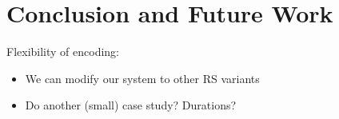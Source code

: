 
\section{Conclusion and Future Work}\label{sec:conc}
Flexibility of encoding:
\begin{itemize}
\item We can modify our system to other RS variants
\item Do another (small) case study? Durations?
\end{itemize}
